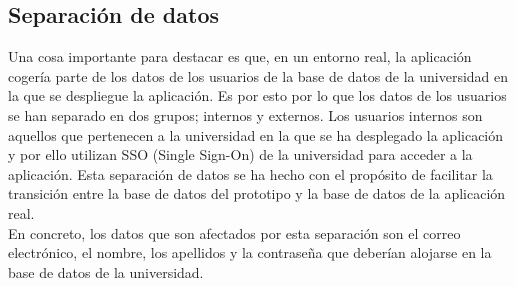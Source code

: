 \documentclass[11pt]{book}
\begin{document}
	\subsection{Separación de datos}
	Una cosa importante para destacar es que, en un entorno real, la aplicación cogería parte de los datos de los usuarios de la base de datos de la universidad en la que se despliegue la aplicación. Es por esto por lo que los datos de los usuarios se han separado en dos grupos; internos y externos. Los usuarios internos son aquellos que pertenecen a la universidad en la que se ha desplegado la aplicación y por ello utilizan SSO (Single Sign-On) de la universidad para acceder a la aplicación. Esta separación de datos se ha hecho con el propósito de facilitar la transición entre la base de datos del prototipo y la base de datos de la aplicación real.\\
	En concreto, los datos que son afectados por esta separación son el correo electrónico, el nombre, los apellidos y la contraseña que deberían alojarse en la base de datos de la universidad.
\end{document}
